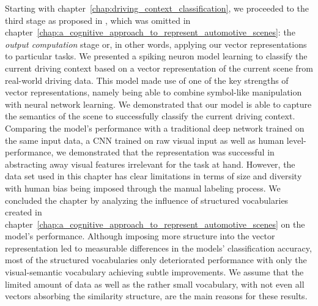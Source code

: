 Starting with chapter~\ref{chap:driving_context_classification}, we proceeded to the third stage as proposed in \textcite{Gallant2013}, which was omitted in chapter~\ref{chap:a_cognitive_approach_to_represent_automotive_scenes}: the \emph{output computation} stage or, in other words, applying our vector representations to particular tasks.
We presented a spiking neuron model learning to classify the current driving context based on a vector representation of the current scene from real-world driving data.
This model made use of one of the key strengths of vector representations, namely being able to combine symbol-like manipulation with neural network learning.
We demonstrated that our model is able to capture the semantics of the scene to successfully classify the current driving context.
Comparing the model's performance with a traditional deep network trained on the same input data, a \ac{CNN} trained on raw visual input as well as human level-performance, we demonstrated that the representation was successful in abstracting away visual features irrelevant for the task at hand.
However, the data set used in this chapter has clear limitations in terms of size and diversity with human bias being imposed through the manual labeling process.
We concluded the chapter by analyzing the influence of structured vocabularies created in chapter~\ref{chap:a_cognitive_approach_to_represent_automotive_scenes} on the model's performance. 
Although imposing more structure into the vector representation led to measurable differences in the models' classification accuracy, most of the structured vocabularies only deteriorated performance with only the visual-semantic vocabulary achieving subtle improvements.
We assume that the limited amount of data as well as the rather small vocabulary, with not even all vectors absorbing the similarity structure, are the main reasons for these results.

